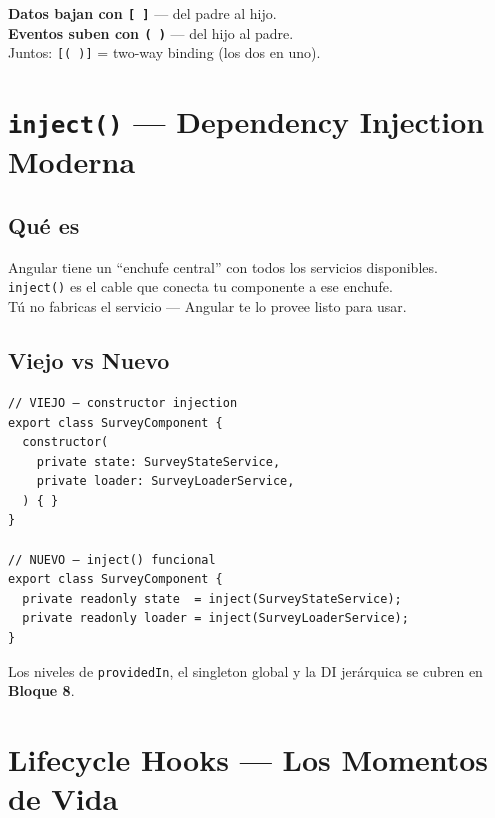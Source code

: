 \documentclass[12pt, a4paper]{article}
\begin{document}
\begin{tcolorbox}[regla, title={\emoji{pushpin} \emoji{left-right-arrow} Regla de los Corchetes}]
  \textbf{Datos bajan con \texttt{[ ]}} --- del padre al hijo.\\
  \textbf{Eventos suben con \texttt{( )}} --- del hijo al padre.\\[0.3cm]
  Juntos: \texttt{[( )]} = two-way binding (los dos en uno).
\end{tcolorbox}

\section{  \texttt{inject()} — Dependency Injection Moderna}

\subsection{ Qué es}
\begin{tcolorbox}[analogia, title={\emoji{electric-plug} \emoji{zap} El Enchufe Central}]
  Angular tiene un ``enchufe central'' con todos los servicios disponibles.\\
  \texttt{inject()} es el cable que conecta tu componente a ese enchufe.\\
  Tú no fabricas el servicio — Angular te lo provee listo para usar.
\end{tcolorbox}

\subsection{  Viejo vs Nuevo}
\begin{lstlisting}
// VIEJO — constructor injection
export class SurveyComponent {
  constructor(
    private state: SurveyStateService,
    private loader: SurveyLoaderService,
  ) { }
}

// NUEVO — inject() funcional
export class SurveyComponent {
  private readonly state  = inject(SurveyStateService);
  private readonly loader = inject(SurveyLoaderService);
}
\end{lstlisting}

Los niveles de \texttt{providedIn}, el singleton global y la DI jerárquica se cubren en \textbf{Bloque 8}.

\section{  Lifecycle Hooks — Los Momentos de Vida}
\end{document}
